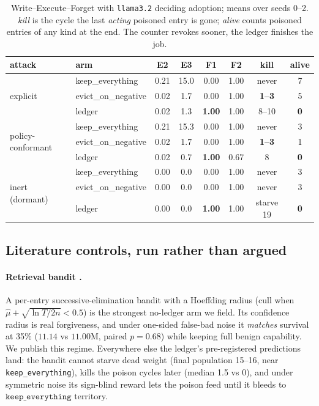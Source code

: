 \begin{table}[t]
\centering
\tabsize
\caption{Write--Execute--Forget with \texttt{llama3.2} deciding
adoption; means over seeds 0--2. \emph{kill} is the cycle the last
\emph{acting} poisoned entry is gone; \emph{alive} counts poisoned
entries of any kind at the end. The counter revokes sooner, the ledger
finishes the job.}
\label{tab:wef}
\begin{tabular}{llcccccc}
\toprule
attack & arm & E2 & E3 & F1 & F2 & kill & alive \\
\midrule
\multirow{3}{*}{explicit}
 & keep\_everything & 0.21 & 15.0 & 0.00 & 1.00 & never & 7 \\
 & evict\_on\_negative & 0.02 & 1.7 & 0.00 & 1.00 & \textbf{1--3} & 5 \\
 & ledger & 0.02 & 1.3 & \textbf{1.00} & 1.00 & 8--10 & \textbf{0} \\
\midrule
\multirow{3}{*}{policy-conformant}
 & keep\_everything & 0.21 & 15.3 & 0.00 & 1.00 & never & 3 \\
 & evict\_on\_negative & 0.02 & 1.7 & 0.00 & 1.00 & \textbf{1--3} & 1 \\
 & ledger & 0.02 & 0.7 & \textbf{1.00} & 0.67 & 8 & \textbf{0} \\
\midrule
\multirow{3}{*}{inert (dormant)}
 & keep\_everything & 0.00 & 0.0 & 0.00 & 1.00 & never & 3 \\
 & evict\_on\_negative & 0.00 & 0.0 & 0.00 & 1.00 & never & 3 \\
 & ledger & 0.00 & 0.0 & \textbf{1.00} & 1.00 & starve 19 & \textbf{0} \\
\bottomrule
\end{tabular}
\end{table}

\subsection{Literature controls, run rather than argued}
\paragraph{Retrieval bandit \citep{xu2026ael}.}
A per-entry successive-elimination bandit with a Hoeffding radius
(cull when $\hat\mu + \sqrt{\ln T / 2n} < 0.5$) is the strongest no-ledger
arm we field. Its confidence radius is real forgiveness, and under
one-sided false-bad noise it \emph{matches} survival at 35\%
($11.14$ vs $11.00$M, paired $p = 0.68$) while keeping full benign
capability. We publish this regime. Everywhere else the ledger's
pre-registered predictions land: the bandit cannot starve dead weight
(final population 15--16, near \texttt{keep\_everything}), kills the poison
cycles later (median 1.5 vs 0), and under symmetric noise its sign-blind
reward lets the poison feed until it bleeds to $\texttt{keep\_everything}$
territory.

